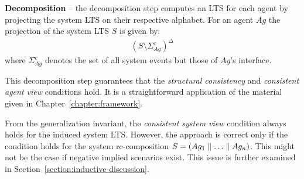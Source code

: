 \noindent \textbf{Decomposition} -- the decomposition step computes an LTS for each agent by projecting the system LTS on their respective alphabet. For an agent $Ag$ the projection of the system LTS $S$ is given by:
\begin{align}
(S \setminus \Sigma_{Ag}^c)^\Delta
\end{align}
\noindent where $\Sigma_{Ag}^c$ denotes the set of all system events but those of $Ag$'s interface.

This decomposition step guarantees that the \emph{structural consistency} and \emph{consistent agent view} conditions hold. It is a straightforward application of the material given in Chapter~\ref{chapter:framework}. 

From the generalization invariant, the \emph{consistent system view} condition always holds for the induced system LTS. However, the approach is correct only if the condition holds for the system re-composition $S = (Ag_1 \parallel \ldots \parallel Ag_n)$. This might not be the case if negative implied scenarios exist. This issue is further examined in Section~\ref{section:inductive-discussion}.
